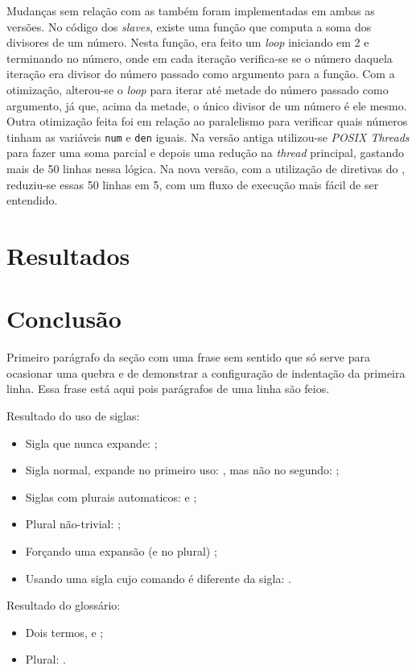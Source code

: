 Mudanças sem relação com as \APIs também foram implementadas em ambas as versões. No código dos \textit{slaves}, existe uma função que computa a soma dos divisores de um número. Nesta função, era feito um \textit{loop} iniciando em 2 e terminando no número, onde em cada iteração verifica-se se o número daquela iteração era divisor do número passado como argumento para a função. Com a otimização, alterou-se o \textit{loop} para iterar até metade do número passado como argumento, já que, acima da metade, o único divisor de um número é ele mesmo. Outra otimização feita foi em relação ao paralelismo para verificar quais números tinham as variáveis \texttt{num} e \texttt{den} iguais. Na versão antiga utilizou-se \textit{POSIX Threads} para fazer uma soma parcial e depois uma redução na \textit{thread} principal, gastando mais de 50 linhas nessa lógica. Na nova versão, com a utilização de diretivas do \OpenMP, reduziu-se essas 50 linhas em 5, com um fluxo de execução mais fácil de ser entendido.

\chapter{Resultados}
\label{ch:resultados}

\chapter{Conclusão}
\label{ch:conclusao}

 Primeiro parágrafo da seção com uma frase sem sentido que só serve para ocasionar uma quebra e de demonstrar a configuração de indentação da primeira linha. Essa frase está aqui pois parágrafos de uma linha são feios.

Resultado do uso de siglas:
\begin{itemize}
\item Sigla que nunca expande: \API;
\item Sigla normal, expande no primeiro uso: \DHT, mas não no segundo: \DHT;
\item Siglas com plurais automaticos: \APIs e \DHTs;
\item Plural não-trivial: \SQs;
\item Forçando uma expansão (e no plural) ;
\item Usando uma sigla cujo comando é diferente da sigla: \WTC.
\end{itemize}

Resultado do glossário:
\begin{itemize}
\item Dois termos, \polling e \proxy;
\item Plural: \proxys.
\end{itemize}


